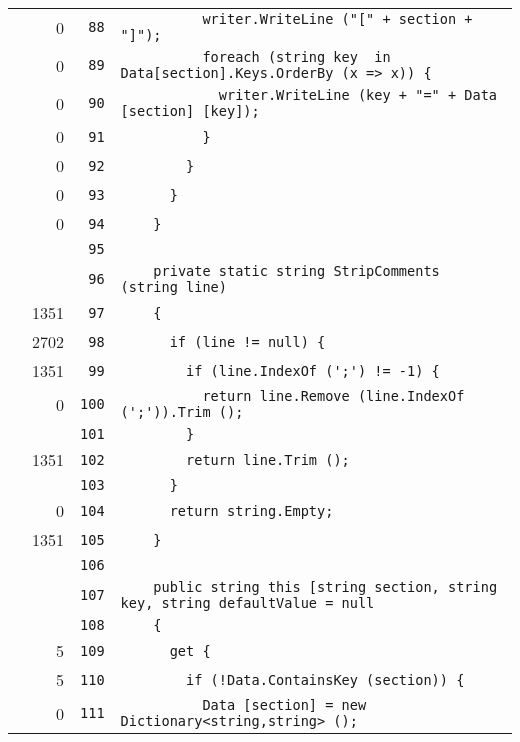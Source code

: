 \documentclass[a4paper,10pt]{article}
\begin{document}
\begin{longtable}[l]{lrrl}
\cellcolor{red} & 0 & \verb~88~ & \verb~          writer.WriteLine ("[" + section + "]");~\\
\cellcolor{red} & 0 & \verb~89~ & \verb~          foreach (string key  in Data[section].Keys.OrderBy (x => x)) {~\\
\cellcolor{red} & 0 & \verb~90~ & \verb~            writer.WriteLine (key + "=" + Data [section] [key]);~\\
\cellcolor{red} & 0 & \verb~91~ & \verb~          }~\\
\cellcolor{red} & 0 & \verb~92~ & \verb~        }~\\
\cellcolor{red} & 0 & \verb~93~ & \verb~      }~\\
\cellcolor{red} & 0 & \verb~94~ & \verb~    }~\\
\cellcolor{gray} &  & \verb~95~ & \verb~~\\
\cellcolor{gray} &  & \verb~96~ & \verb~    private static string StripComments (string line)~\\
\cellcolor{green} & 1351 & \verb~97~ & \verb~    {~\\
\cellcolor{green} & 2702 & \verb~98~ & \verb~      if (line != null) {~\\
\cellcolor{green} & 1351 & \verb~99~ & \verb~        if (line.IndexOf (';') != -1) {~\\
\cellcolor{red} & 0 & \verb~100~ & \verb~          return line.Remove (line.IndexOf (';')).Trim ();~\\
\cellcolor{gray} &  & \verb~101~ & \verb~        }~\\
\cellcolor{green} & 1351 & \verb~102~ & \verb~        return line.Trim ();~\\
\cellcolor{gray} &  & \verb~103~ & \verb~      }~\\
\cellcolor{red} & 0 & \verb~104~ & \verb~      return string.Empty;~\\
\cellcolor{green} & 1351 & \verb~105~ & \verb~    }~\\
\cellcolor{gray} &  & \verb~106~ & \verb~~\\
\cellcolor{gray} &  & \verb~107~ & \verb~    public string this [string section, string key, string defaultValue = null~\\
\cellcolor{gray} &  & \verb~108~ & \verb~    {~\\
\cellcolor{green} & 5 & \verb~109~ & \verb~      get {~\\
\cellcolor{green} & 5 & \verb~110~ & \verb~        if (!Data.ContainsKey (section)) {~\\
\cellcolor{red} & 0 & \verb~111~ & \verb~          Data [section] = new Dictionary<string,string> ();~\\

\end{longtable}
\end{document}
